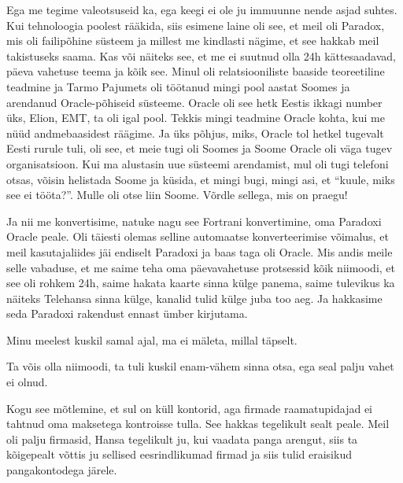 Ega me tegime valeotsuseid ka, ega keegi ei ole ju immuunne nende asjad suhtes. Kui tehnoloogia poolest rääkida, siis  esimene laine oli see, et meil oli Paradox, mis oli failipõhine süsteem ja millest me kindlasti nägime, et see hakkab meil takistuseks saama. Kas või näiteks see, et me ei suutnud olla 24h kättesaadavad, päeva vahetuse teema ja kõik see. Minul oli relatsiooniliste baaside  teoreetiline teadmine ja Tarmo Pajumets oli töötanud mingi pool aastat Soomes ja arendanud Oracle-põhiseid süsteeme. Oracle oli see hetk  Eestis ikkagi number üks, Elion, EMT, ta oli igal pool. Tekkis mingi teadmine Oracle kohta, kui me nüüd andmebaasidest räägime. Ja üks põhjus, miks, Oracle tol hetkel tugevalt Eesti rurule tuli,  oli see, et meie tugi oli Soomes ja Soome Oracle oli väga tugev organisatsioon. Kui ma alustasin uue süsteemi arendamist,  mul oli tugi telefoni otsas, võisin helistada Soome ja küsida, et mingi bugi, mingi asi, et \enquote{kuule, miks see ei tööta?}. Mulle oli otse liin Soome. Võrdle sellega, mis on praegu!

Ja nii me konvertisime,  natuke nagu see Fortrani konvertimine, oma Paradoxi Oracle peale.  Oli täiesti olemas selline automaatse konverteerimise võimalus, et meil kasutajaliides jäi endiselt Paradoxi ja baas taga oli Oracle. Mis andis meile selle vabaduse, et me saime teha oma päevavahetuse protsessid kõik niimoodi, et see oli rohkem 24h, saime hakata kaarte sinna külge panema, saime  tulevikus ka näiteks Telehansa sinna külge, kanalid tulid külge juba too aeg. Ja hakkasime seda Paradoxi rakendust ennast ümber kirjutama. 


Minu meelest kuskil samal ajal, ma ei mäleta, millal täpselt.


Ta võis olla niimoodi, ta tuli kuskil enam-vähem sinna otsa, ega seal palju vahet ei olnud. 


Kogu see mõtlemine, et sul on küll kontorid, aga firmade raamatupidajad ei tahtnud oma maksetega kontroisse tulla. See hakkas tegelikult sealt peale. Meil oli palju firmasid, Hansa tegelikult ju, kui vaadata panga  arengut, siis ta  kõigepealt võttis ju sellised eesrindlikumad firmad ja siis tulid eraisikud pangakontodega järele. 

